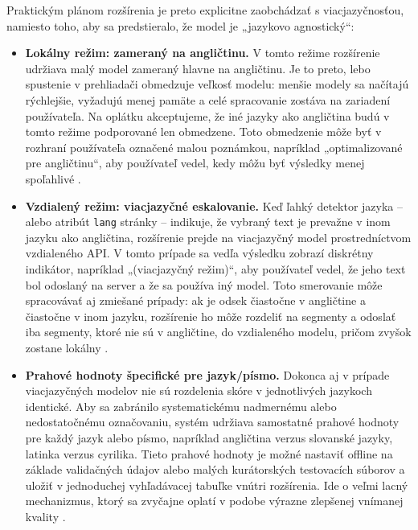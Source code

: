 Praktickým plánom rozšírenia je preto explicitne zaobchádzať s viacjazyčnosťou, namiesto toho, aby sa predstieralo, že model je „jazykovo agnostický“:
\begin{itemize}
  \item \textbf{Lokálny režim: zameraný na angličtinu.} V tomto režime rozšírenie udržiava malý model zameraný hlavne na angličtinu. Je to preto, lebo spustenie v prehliadači obmedzuje veľkosť modelu: menšie modely sa načítajú rýchlejšie, vyžadujú menej pamäte a celé spracovanie zostáva na zariadení používateľa. Na oplátku akceptujeme, že iné jazyky ako angličtina budú v tomto režime podporované len obmedzene. Toto obmedzenie môže byť v rozhraní používateľa označené malou poznámkou, napríklad „optimalizované pre angličtinu“, aby používateľ vedel, kedy môžu byť výsledky menej spoľahlivé \cite{jigsaw2020multilingual}\cite{tfjsToxicity}\cite{distilbert2019}.

  \item \textbf{Vzdialený režim: viacjazyčné eskalovanie.} Keď ľahký detektor jazyka – alebo atribút \texttt{lang} stránky – indikuje, že vybraný text je prevažne v inom jazyku ako angličtina, rozšírenie prejde na viacjazyčný model prostredníctvom vzdialeného API. V tomto prípade sa vedľa výsledku zobrazí diskrétny indikátor, napríklad „(viacjazyčný režim)“, aby používateľ vedel, že jeho text bol odoslaný na server a že sa používa iný model. Toto smerovanie môže spracovávať aj zmiešané prípady: ak je odsek čiastočne v angličtine a čiastočne v inom jazyku, rozšírenie ho môže rozdeliť na segmenty a odoslať iba segmenty, ktoré nie sú v angličtine, do vzdialeného modelu, pričom zvyšok zostane lokálny \cite{jigsaw2020multilingual}\cite{perspectiveAPI}\cite{xlmr2020}.

  \item \textbf{Prahové hodnoty špecifické pre jazyk/písmo.} Dokonca aj v prípade viacjazyčných modelov nie sú rozdelenia skóre v jednotlivých jazykoch identické. Aby sa zabránilo systematickému nadmernému alebo nedostatočnému označovaniu, systém udržiava samostatné prahové hodnoty pre každý jazyk alebo písmo, napríklad angličtina verzus slovanské jazyky, latinka verzus cyrilika. Tieto prahové hodnoty je možné nastaviť offline na základe validačných údajov alebo malých kurátorských testovacích súborov a uložiť v jednoduchej vyhľadávacej tabuľke vnútri rozšírenia. Ide o veľmi lacný mechanizmus, ktorý sa zvyčajne oplatí v podobe výrazne zlepšenej vnímanej kvality \cite{jigsaw2019bias}\cite{jigsaw2020multilingual}\cite{borkan2019nuanced}.
\end{itemize}

